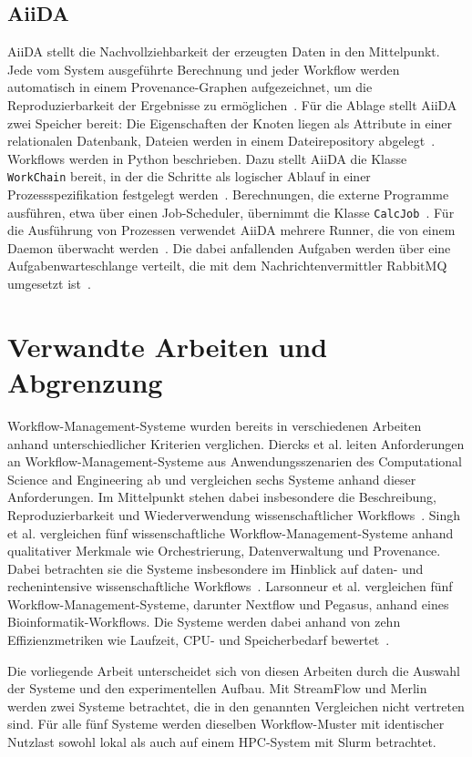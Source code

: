 \subsection{AiiDA}
\label{sec:basics:aiida}
AiiDA stellt die Nachvollziehbarkeit der erzeugten Daten in den
Mittelpunkt. Jede vom System ausgeführte Berechnung und jeder
Workflow werden automatisch in einem Provenance-Graphen
aufgezeichnet, um die Reproduzierbarkeit der Ergebnisse zu
ermöglichen~\cite[S.~2]{huber2020aiida}. Für die Ablage stellt
AiiDA zwei Speicher bereit: Die Eigenschaften der Knoten liegen
als Attribute in einer relationalen Datenbank, Dateien werden in
einem Dateirepository abgelegt~\cite[S.~8]{huber2020aiida}.
Workflows werden in Python beschrieben. Dazu stellt AiiDA die
Klasse \texttt{WorkChain} bereit, in der die Schritte als
logischer Ablauf in einer Prozessspezifikation festgelegt
werden~\cite[S.~4\,f.]{huber2020aiida}. Berechnungen, die externe
Programme ausführen, etwa über einen Job-Scheduler, übernimmt die
Klasse \texttt{CalcJob}~\cite[S.~4]{huber2020aiida}.
Für die Ausführung von Prozessen verwendet AiiDA mehrere Runner,
die von einem Daemon überwacht werden~\cite[S.~3]{huber2020aiida}. Die dabei
anfallenden Aufgaben werden über eine Aufgabenwarteschlange
verteilt, die mit dem Nachrichtenvermittler RabbitMQ umgesetzt
ist~\cite[S.~3]{huber2020aiida}.

\section{Verwandte Arbeiten und Abgrenzung}
\label{sec:basics:related}
Workflow-Management-Systeme wurden bereits in verschiedenen
Arbeiten anhand unterschiedlicher Kriterien verglichen.
Diercks et al. leiten Anforderungen an Workflow-Management-Systeme
aus Anwendungsszenarien des Computational Science and Engineering
ab und vergleichen sechs Systeme anhand dieser Anforderungen.
Im Mittelpunkt stehen dabei insbesondere die Beschreibung,
Reproduzierbarkeit und Wiederverwendung wissenschaftlicher
Workflows~\cite[S.~1]{diercks2023evaluation}.
Singh et al. vergleichen fünf wissenschaftliche
Workflow-Management-Systeme anhand qualitativer Merkmale wie
Orchestrierung, Datenverwaltung und Provenance.
Dabei betrachten sie die Systeme insbesondere im Hinblick auf
daten- und rechenintensive wissenschaftliche
Workflows~\cite[S.~4553]{singh2019evaluating}.
Larsonneur et al. vergleichen fünf Workflow-Management-Systeme,
darunter Nextflow und Pegasus, anhand eines
Bioinformatik-Workflows. Die Systeme werden dabei anhand von
zehn Effizienzmetriken wie Laufzeit, CPU- und Speicherbedarf
bewertet~\cite[S.~2773\,f.]{larsonneur2018evaluating}.

Die vorliegende Arbeit unterscheidet sich von diesen Arbeiten
durch die Auswahl der Systeme und den experimentellen Aufbau.
Mit StreamFlow und Merlin werden zwei Systeme betrachtet, die in
den genannten Vergleichen nicht vertreten sind. Für alle fünf
Systeme werden dieselben Workflow-Muster mit identischer Nutzlast
sowohl lokal als auch auf einem HPC-System mit Slurm betrachtet.